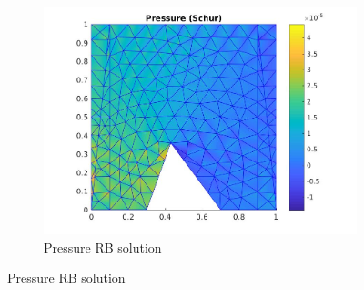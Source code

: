 \documentclass[graybox]{svmult}
\begin{document}
\begin{figure}
\begin{subfigure}{0.31\textwidth}
\includegraphics[width=\linewidth]{offline_pressure_at_43_36.jpg}
\caption{Pressure RB solution} \label{pre_rb}
\end{subfigure}


\end{figure}
\end{document}
